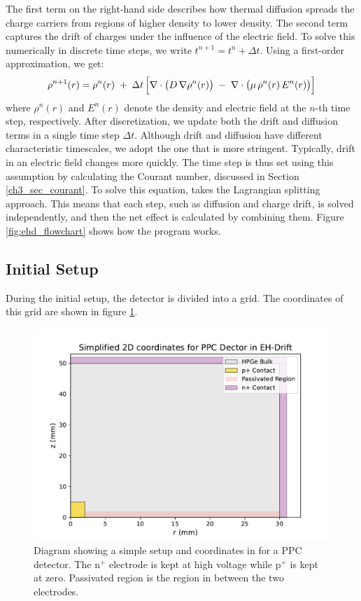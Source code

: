 The first term on the right-hand side describes how thermal diffusion spreads the charge carriers from regions of higher density to lower density. The second term captures the drift of  charges under the influence of the electric field. To solve this numerically in discrete time steps, we write $t^{n+1} = t^n + \Delta t$. Using a first-order approximation, we get:
\begin{equation}\label{ch3_eq_ehdrift_discrete}
\rho^{n+1}({r}) 
=
\rho^n({r})
\;+\;
\Delta t \,
\Bigl[
\nabla \cdot \bigl(D\,\nabla\rho^n({r})\bigr)
\;-\;
\nabla \cdot \bigl(\mu\,\rho^n({r})\,{E}^n({r})\bigr)
\Bigr]
\end{equation}
where $\rho^n({r})$ and ${E}^n({r})$ denote the density and electric field at
the $n$-th time step, respectively. After discretization, we update both the drift and diffusion terms in a single time step $\Delta t$. Although drift and diffusion have different characteristic timescales, we adopt the one that is more stringent. Typically, drift in an electric field changes more quickly. The time step is thus set using this assumption by calculating the Courant number, discussed in Section \ref{ch3_sec_courant}. To solve this equation, {\ehd} takes the Lagrangian splitting approach. This means that each step, such as diffusion and charge drift, is solved independently, and then the net effect is calculated by combining them. Figure \ref{fig:ehd_flowchart} shows how the {\ehd} program works. 

\subsection{Initial Setup}
During the initial setup, the detector is divided into a grid. The coordinates of this grid are shown in figure \ref{ch3_fig_coordinates}.

\begin{figure}[!htb]
\centering
\includegraphics[width=0.80\linewidth,trim={0pc 0pc 0pc 0pc},clip]{ch3/figs/ppc_coordinates.pdf}
\caption{Diagram showing a simple setup and coordinates in {\ehd} for a PPC detector. The n$^+$ electrode is kept at high voltage while p$^+$ is kept at zero. Passivated region is the region in between the two electrodes.}
\label{ch3_fig_coordinates}
\end{figure}

